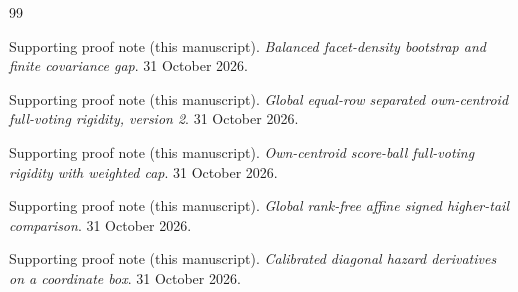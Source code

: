 \begin{thebibliography}{99}
\par{}




Supporting proof note (this manuscript). \emph{Balanced facet-density bootstrap and finite covariance gap}. 31 October 2026.

\par{}




Supporting proof note (this manuscript). \emph{Global equal-row separated own-centroid full-voting rigidity, version 2}. 31 October 2026.

\par{}




Supporting proof note (this manuscript). \emph{Own-centroid score-ball full-voting rigidity with weighted cap}. 31 October 2026.

\par{}




Supporting proof note (this manuscript). \emph{Global rank-free affine signed higher-tail comparison}. 31 October 2026.

\par{}




Supporting proof note (this manuscript). \emph{Calibrated diagonal hazard derivatives on a coordinate box}. 31 October 2026.

\par{}




\end{thebibliography}
